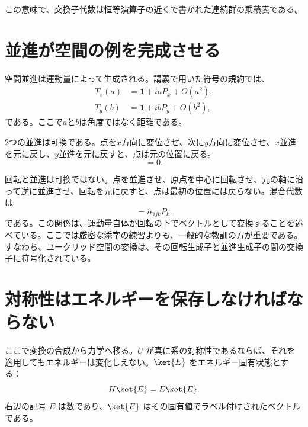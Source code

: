 この意味で、交換子代数は恒等演算子の近くで書かれた連続群の乗積表である。

\section{並進が空間の例を完成させる}

空間並進は運動量によって生成される。講義で用いた符号の規約では、
\begin{equation}
\begin{aligned}
T_x(a)&=\mathbf 1+iaP_x+O(a^2),\\
T_y(b)&=\mathbf 1+ibP_y+O(b^2),
\end{aligned}
\end{equation}
である。ここで\(a\)と\(b\)は角度ではなく距離である。

2つの並進は可換である。点を\(x\)方向に変位させ、次に\(y\)方向に変位させ、\(x\)並進を元に戻し、\(y\)並進を元に戻すと、点は元の位置に戻る。
\begin{equation}
[P_i,P_j]=0.
\end{equation}

\begin{classroomqa}
\end{classroomqa}

回転と並進は可換ではない。点を並進させ、原点を中心に回転させ、元の軸に沿って逆に並進させ、回転を元に戻すと、点は最初の位置には戻らない。混合代数は
\begin{equation}
[L_i,P_j]=i\epsilon_{ijk}P_k.
\end{equation}
である。この関係は、運動量自体が回転の下でベクトルとして変換することを述べている。ここでは厳密な添字の練習よりも、一般的な教訓の方が重要である。すなわち、ユークリッド空間の変換は、その回転生成子と並進生成子の間の交換子に符号化されている。

\section{対称性はエネルギーを保存しなければならない}

ここで変換の合成から力学へ移る。\(U\) が真に系の対称性であるならば、それを適用してもエネルギーは変化しえない。\(\ket{E}\) をエネルギー固有状態とする：
\begin{equation}
H\ket{E}=E\ket{E}.
\end{equation}
右辺の記号 \(E\) は数であり、\(\ket{E}\) はその固有値でラベル付けされたベクトルである。

